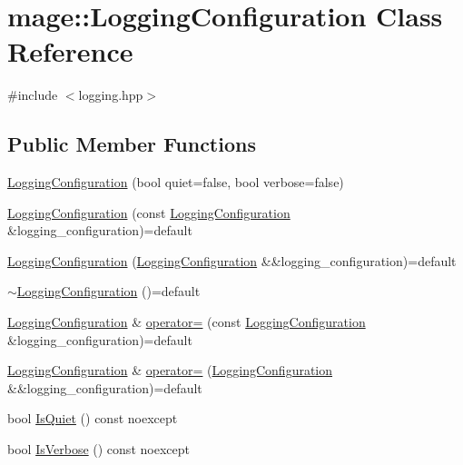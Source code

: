 \hypertarget{classmage_1_1_logging_configuration}{}\section{mage\+:\+:Logging\+Configuration Class Reference}
\label{classmage_1_1_logging_configuration}


{\ttfamily \#include $<$logging.\+hpp$>$}

\subsection*{Public Member Functions}
\begin{DoxyCompactItemize}
\item 
\hyperlink{classmage_1_1_logging_configuration_ab18d18c78e7104f4c677e6d08f31ca01}{Logging\+Configuration} (bool quiet=false, bool verbose=false)
\item 
\hyperlink{classmage_1_1_logging_configuration_a8e4ccd4301f5544213edd3b600cccff9}{Logging\+Configuration} (const \hyperlink{classmage_1_1_logging_configuration}{Logging\+Configuration} \&logging\+\_\+configuration)=default
\item 
\hyperlink{classmage_1_1_logging_configuration_ad5d3dd901720450fcf57d4b1b32fce15}{Logging\+Configuration} (\hyperlink{classmage_1_1_logging_configuration}{Logging\+Configuration} \&\&logging\+\_\+configuration)=default
\item 
\hyperlink{classmage_1_1_logging_configuration_a842cd1d5cf22c9fb6e2c76e684cd08ee}{$\sim$\+Logging\+Configuration} ()=default
\item 
\hyperlink{classmage_1_1_logging_configuration}{Logging\+Configuration} \& \hyperlink{classmage_1_1_logging_configuration_af35d0b0a2f5743944d3d9d66580074db}{operator=} (const \hyperlink{classmage_1_1_logging_configuration}{Logging\+Configuration} \&logging\+\_\+configuration)=default
\item 
\hyperlink{classmage_1_1_logging_configuration}{Logging\+Configuration} \& \hyperlink{classmage_1_1_logging_configuration_a699285ff50d1bb7573cc0c28bcf476b1}{operator=} (\hyperlink{classmage_1_1_logging_configuration}{Logging\+Configuration} \&\&logging\+\_\+configuration)=default
\item 
bool \hyperlink{classmage_1_1_logging_configuration_a64f7a7b45bc0e896b9d493ddaf13ca82}{Is\+Quiet} () const noexcept
\item 
bool \hyperlink{classmage_1_1_logging_configuration_a4ad7dc55f8d105c1125adcea4796bb3b}{Is\+Verbose} () const noexcept
\end{DoxyCompactItemize}
